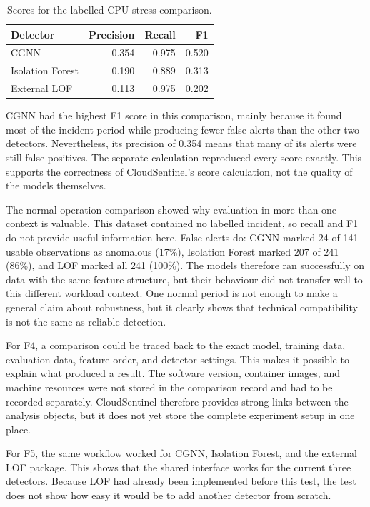 \begin{table}[H]
    \centering
    \small
    \caption{Scores for the labelled CPU-stress comparison.}
    \label{tab:h9-functional-labelled-scores}
    \begin{tabular}{|l|r|r|r|}
        \hline
        Detector & Precision & Recall & F1 \\
        \hline
        CGNN & 0.354 & 0.975 & 0.520 \\
        Isolation Forest & 0.190 & 0.889 & 0.313 \\
        External LOF & 0.113 & 0.975 & 0.202 \\
        \hline
    \end{tabular}
\end{table}

CGNN had the highest F1 score in this comparison, mainly because it found most
of the incident period while producing fewer false alerts than the other two
detectors. Nevertheless, its precision of 0.354 means that many of its alerts
were still false positives. The separate calculation reproduced every score
exactly. This supports the correctness of CloudSentinel's score calculation,
not the quality of the models themselves.

The normal-operation comparison showed why evaluation in more than one
context is valuable. This dataset contained no labelled incident, so recall
and F1 do not provide useful information here. False alerts do: CGNN marked 24
of 141 usable observations as anomalous (17\%), Isolation Forest marked 207 of
241 (86\%), and LOF marked all 241 (100\%). The models therefore ran
successfully on data with the same feature structure, but their behaviour did
not transfer well to this different workload context. One normal period is not
enough to make a general claim about robustness, but it clearly shows that
technical compatibility is not the same as reliable detection.

For F4, a comparison could be traced back to the exact model, training data,
evaluation data, feature order, and detector settings. This makes it possible
to explain what produced a result. The software version, container images,
and machine resources were not stored in the comparison record and had to be
recorded separately. CloudSentinel therefore provides strong links between
the analysis objects, but it does not yet store the complete experiment setup
in one place.

For F5, the same workflow worked for CGNN, Isolation Forest, and the external
LOF package. This shows that the shared interface works for the current three
detectors. Because LOF had already been implemented before this test, the test
does not show how easy it would be to add another detector from scratch.

